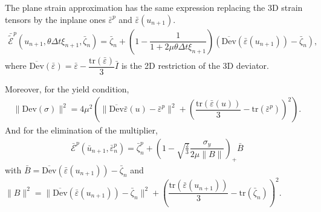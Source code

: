 \documentclass[a4paper,11pt,english]{sphinxmanual}
\begin{document}
The plane strain approximation has the same expression replacing the 3D strain tensors by the in\sphinxhyphen{}plane ones \(\bar{\varepsilon}^p\) and  \(\bar{\varepsilon}(u_{n+1})\).
\begin{equation*}
\begin{split}\bar{\tilde{\mathscr E}}^p(u_{n+1}, \theta \Delta t \xi_{n+1}, \bar{\zeta}_{n}) = \bar{\zeta}_n + \left(1-\dfrac{1}{1+2\mu\theta\Delta t\xi_{n+1}}\right)(\overline{\mbox{Dev}}(\bar{\varepsilon}(u_{n+1})) - \bar{\zeta}_n),\end{split}
\end{equation*}
where \(\overline{\mbox{Dev}}(\bar{\varepsilon}) = \bar{\varepsilon} - \dfrac{\mbox{tr}(\bar{\varepsilon})}{3} \bar{I}\) is the 2D restriction of the 3D deviator.

Moreover, for the yield condition,
\begin{equation*}
\begin{split}\|\mbox{Dev}(\sigma)\|^2 = 4\mu^2\left(\|\overline{\mbox{Dev}}\bar{\varepsilon}(u) - \bar{\varepsilon}^p\|^2 + \left(\dfrac{\mbox{tr}(\bar{\varepsilon}(u))}{3} -\mbox{tr}(\bar{\varepsilon}^p) \right)^2\right).\end{split}
\end{equation*}
And for the elimination of the multiplier,
\begin{equation*}
\begin{split}\bar{\mathscr E}^p(\bar{u}_{n+1}, \bar{\varepsilon}^p_{n}) = \bar{\zeta}^p_{n} + \left( 1 - \sqrt{\frac{2}{3}}\dfrac{\sigma_y}{2\mu\|B\|}\right)_+ \bar{B}\end{split}
\end{equation*}
with \(\bar{B} = \overline{\mbox{Dev}}(\bar{\varepsilon}(u_{n+1}))-\bar{\zeta}_{n}\) and \(\|B\|^2 = \|\overline{\mbox{Dev}}(\bar{\varepsilon}(u_{n+1})) - \bar{\zeta}_n\|^2 + \left(\dfrac{\mbox{tr}(\bar{\varepsilon}(u_{n+1}))}{3} -\mbox{tr}(\bar{\zeta}_n) \right)^2\).

\end{document}
